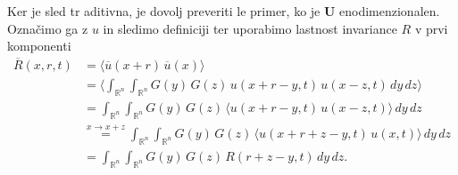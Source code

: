 \documentclass[mat2, tisk]{fmfdelo}
\newcommand{\bd}{\textbf}
\begin{document}
\begin{dokaz}
Ker je sled tr aditivna, je dovolj preveriti le primer, ko je 
$\bd{U}$ enodimenzionalen. Označimo ga z $u$ in sledimo definiciji 
ter uporabimo lastnost invariance $R$ v prvi komponenti
\begin{align*}
  \overline{R}(x, r, t) &= \langle \overline{u}(x + r)\,\overline{u}(x) \rangle \\
  &= \Big\langle \int_{\mathbb{R}^n} \int_{\mathbb{R}^n} G(y)\,G(z)\,u(x + r - y, t)\,u(x - z, t)\,dy\,dz \Big\rangle \\
  &= \int_{\mathbb{R}^n} \int_{\mathbb{R}^n} G(y)\,G(z)\,\langle u(x + r - y, t)\,u(x - z, t) \rangle\,dy\,dz \\
  &\stackrel{x \rightarrow x + z}{=} \int_{\mathbb{R}^n} \int_{\mathbb{R}^n} G(y)\,G(z)\,\langle u(x + r + z - y, t)\,u(x, t) \rangle\,dy\,dz \\
  &= \int_{\mathbb{R}^n} \int_{\mathbb{R}^n} G(y)\,G(z)\,R(r + z - y, t)\,dy\,dz.
  \end{align*}


\end{dokaz}
\end{document}
